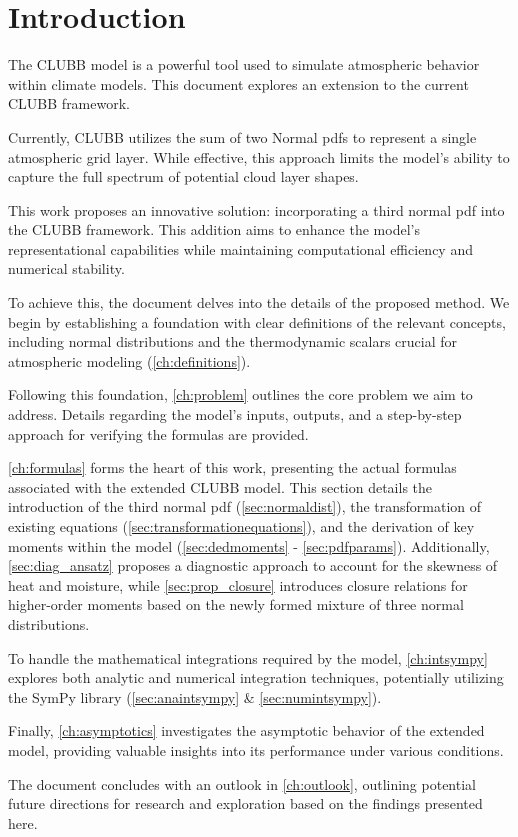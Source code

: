 \chapter{Introduction}\label{ch:introduction}

The \gls{CLUBB} model is a powerful tool used to simulate atmospheric behavior within climate models. This document explores an extension to the current \gls{CLUBB} framework.

Currently, \gls{CLUBB} utilizes the sum of two Normal \glspl{pdf} to represent a single atmospheric grid layer.
While effective, this approach limits the model's ability to capture the full spectrum of potential cloud layer shapes.

This work proposes an innovative solution: incorporating a third normal \gls{pdf} into the \gls{CLUBB} framework.
This addition aims to enhance the model's representational capabilities while maintaining computational efficiency and numerical stability.

To achieve this, the document delves into the details of the proposed method.
We begin by establishing a foundation with clear definitions of the relevant concepts, including normal distributions and the thermodynamic scalars crucial for atmospheric modeling (\autoref{ch:definitions}).

Following this foundation, \autoref{ch:problem} outlines the core problem we aim to address.
Details regarding the model's inputs, outputs, and a step-by-step approach for verifying the formulas are provided.

\autoref{ch:formulas} forms the heart of this work, presenting the actual formulas associated with the extended CLUBB model.
This section details the introduction of the third normal \gls{pdf} (\autoref{sec:normaldist}), the transformation of existing equations (\autoref{sec:transformationequations}), and the derivation of key moments within the model (\autoref{sec:dedmoments} - \autoref{sec:pdfparams}).
Additionally, \autoref{sec:diag_ansatz} proposes a diagnostic approach to account for the skewness of heat and moisture, while \autoref{sec:prop_closure} introduces closure relations for higher-order moments based on the newly formed mixture of three normal distributions.

To handle the mathematical integrations required by the model, \autoref{ch:intsympy} explores both analytic and numerical integration techniques, potentially utilizing the SymPy library (\autoref{sec:anaintsympy} \& \autoref{sec:numintsympy}).

Finally, \autoref{ch:asymptotics} investigates the asymptotic behavior of the extended model, providing valuable insights into its performance under various conditions.

The document concludes with an outlook in \autoref{ch:outlook}, outlining potential future directions for research and exploration based on the findings presented here.
